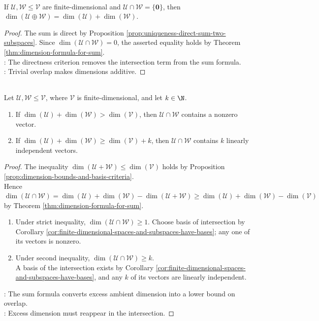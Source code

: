\begin{corollary} \label{cor:dimension-direct-sum} \\
If $\mathcal{U},\mathcal{W}\leq\mathcal{V}$ are finite-dimensional and $\mathcal{U}\cap\mathcal{W}=\{\mathbf{0}\}$, then $\dim(\mathcal{U}\oplus\mathcal{W})=\dim(\mathcal{U})+\dim(\mathcal{W})$.
\begin{proof}
The sum is direct by Proposition \ref{prop:uniqueness-direct-sum-two-subspaces}. Since $\dim(\mathcal{U}\cap\mathcal{W})=0$, the asserted equality holds by Theorem \ref{thm:dimension-formula-for-sum}.\\
: The directness criterion removes the intersection term from the sum formula.\\
: Trivial overlap makes dimensions additive.
\end{proof}
\end{corollary}

\begin{corollary} \label{cor:large-subspaces-intersect} \\
Let $\mathcal{U},\mathcal{W}\leq\mathcal{V}$, where $\mathcal{V}$ is finite-dimensional, and let $k\in\N$.
\begin{enumerate}[label=(\roman*)]
\setlength{\itemsep}{0pt}
\item If $\dim(\mathcal{U})+\dim(\mathcal{W})>\dim(\mathcal{V})$, then $\mathcal{U}\cap\mathcal{W}$ contains a nonzero vector.
\item If $\dim(\mathcal{U})+\dim(\mathcal{W})\geq\dim(\mathcal{V})+k$, then $\mathcal{U}\cap\mathcal{W}$ contains $k$ linearly independent vectors.
\end{enumerate}
\begin{proof}
The inequality $\dim(\mathcal{U}+\mathcal{W})\leq\dim(\mathcal{V})$ holds by Proposition \ref{prop:dimension-bounds-and-basis-criteria}.\\
Hence $\dim(\mathcal{U}\cap\mathcal{W})=\dim(\mathcal{U})+\dim(\mathcal{W})-\dim(\mathcal{U}+\mathcal{W})\geq\dim(\mathcal{U})+\dim(\mathcal{W})-\dim(\mathcal{V})$ by Theorem \ref{thm:dimension-formula-for-sum}.
\begin{enumerate}[label=(\roman*)]
\setlength{\itemsep}{0pt}
\item Under strict inequality, $\dim(\mathcal{U}\cap\mathcal{W})\geq1$. Choose basis of intersection by Corollary \ref{cor:finite-dimensional-spaces-and-subspaces-have-bases}; any one of its vectors is nonzero.
\item Under second inequality, $\dim(\mathcal{U}\cap\mathcal{W})\geq k$.\\
A basis of the intersection exists by Corollary \ref{cor:finite-dimensional-spaces-and-subspaces-have-bases}, and any $k$ of its vectors are linearly independent.
\end{enumerate}
: The sum formula converts excess ambient dimension into a lower bound on overlap.\\
: Excess dimension must reappear in the intersection.
\end{proof}
\end{corollary}

